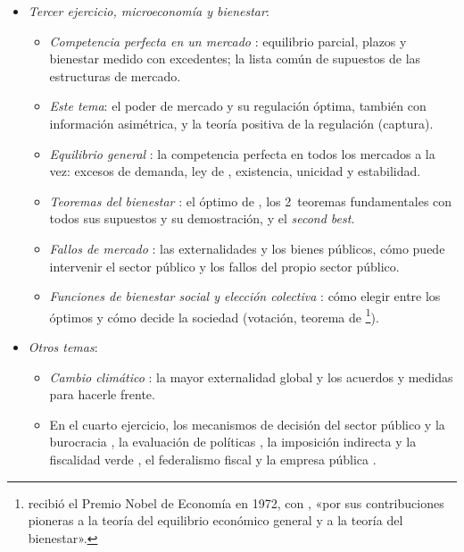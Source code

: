 \documentclass[11pt]{article}
\begin{document}
\begin{itemize}
\item \emph{Tercer ejercicio, microeconomía y bienestar}:
  \begin{itemize}
  \item \emph{Competencia perfecta en un mercado} : equilibrio parcial, plazos y bienestar medido con excedentes; la lista común de supuestos de las estructuras de mercado.
  \item \emph{Este tema}: el poder de mercado y su regulación óptima, también con información asimétrica, y la teoría positiva de la regulación (captura).
  \item \emph{Equilibrio general} : la competencia perfecta en todos los mercados a la vez: excesos de demanda, ley de , existencia, unicidad y estabilidad.
  \item \emph{Teoremas del bienestar} : el óptimo de , los 2~teoremas fundamentales con todos sus supuestos y su demostración, y el \emph{second best}.
  \item \emph{Fallos de mercado} : las externalidades y los bienes públicos, cómo puede intervenir el sector público y los fallos del propio sector público.
  \item \emph{Funciones de bienestar social y elección colectiva} : cómo elegir entre los óptimos y cómo decide la sociedad (votación, teorema de \footnote{ recibió el Premio Nobel de Economía en 1972, con , «por sus contribuciones pioneras a la teoría del equilibrio económico general y a la teoría del bienestar»\nocite{Nobel1972HicksArrow}.}).
  \end{itemize}
\item \emph{Otros temas}:
  \begin{itemize}
  \item \emph{Cambio climático} : la mayor externalidad global y los acuerdos y medidas para hacerle frente.
  \item En el cuarto ejercicio, los mecanismos de decisión del sector público y la burocracia , la evaluación de políticas , la imposición indirecta y la fiscalidad verde , el federalismo fiscal  y la empresa pública .
  \end{itemize}
\end{itemize}

\end{document}
